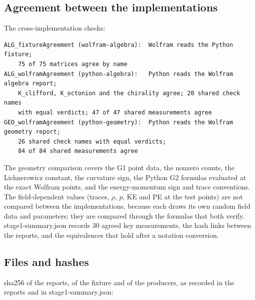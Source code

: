 \documentclass[11pt]{article}
\begin{document}
\subsection{Agreement between the implementations}

The cross-implementation checks:

\begin{Verbatim}[fontsize=\small]
ALG_fixtureAgreement (wolfram-algebra):  Wolfram reads the Python fixture;
    75 of 75 matrices agree by name
ALG_wolframAgreement (python-algebra):   Python reads the Wolfram algebra report;
    K_clifford, K_octonion and the chirality agree; 20 shared check names
    with equal verdicts; 47 of 47 shared measurements agree
GEO_wolframAgreement (python-geometry):  Python reads the Wolfram geometry report;
    26 shared check names with equal verdicts;
    84 of 84 shared measurements agree
\end{Verbatim}

The geometry comparison covers the G1 point data, the nonzero counts, the Lichnerowicz constant, the curvature sign, the Python G2 formulas evaluated at the exact Wolfram points, and the energy-momentum sign and trace conventions. The field-dependent values (traces, $\rho$, $p$, KE and PE at the test points) are not compared between the implementations, because each draws its own random field data and parameters; they are compared through the formulas that both verify. stage1-summary.json records 30 agreed key measurements, the hash links between the reports, and the equivalences that hold after a notation conversion.

\subsection{Files and hashes}

sha256 of the reports, of the fixture and of the producers, as recorded in the reports and in stage1-summary.json:
\end{document}
